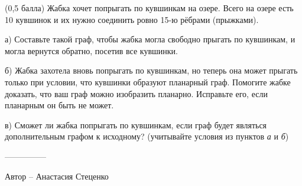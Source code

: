 \question
(0,5 балла) Жабка хочет попрыгать по кувшинкам на озере. Всего на озере есть 10 кувшинок и их нужно соединить ровно 15-ю рёбрами (прыжками). 

а) Составьте такой граф, чтобы жабка могла свободно прыгать по кувшинкам, и могла вернутся обратно, посетив все кувшинки.

б) Жабка захотела вновь попрыгать по кувшинкам, но теперь она может прыгать только при условии, что кувшинки образуют планарный граф. Помогите жабке доказать, что ваш граф можно изобразить планарно. Исправьте его, если планарным он быть не может.

в) Сможет ли жабка попрыгать по кувшинкам, если граф будет являться дополнительным графом к исходному? (учитывайте условия из пунктов \textit{а} и \textit{б})

---------------

Автор -- Анастасия Стеценко
